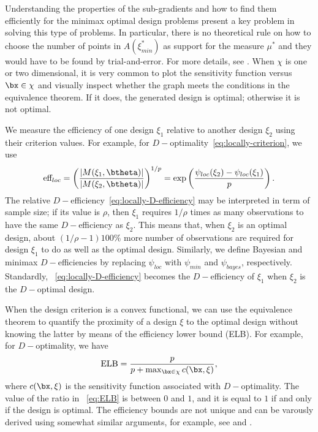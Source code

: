 Understanding the properties of the sub-gradients and how to find them efficiently for the minimax  optimal design problems present a key problem in solving this type of problems.    In particular,  there is no theoretical rule on how to choose the number of points in $A(\xi_{min}^*)$  as support for the measure $\mu^*$ and they would have to be found by trial-and-error. For more details, see \citet{masoudi2017}.
When $\chi$ is one or two dimensional, it is very common to plot the sensitivity function versus $\bx \in \chi$ and  visually inspect whether the graph meets the conditions in the equivalence theorem.  If it does, the generated design is optimal; otherwise it is not optimal.

We measure the efficiency  of one design $\xi_1$ relative to another design $\xi_2$ using their criterion values.
For example, for $D-$optimality~\eqref{eq:locally-criterion}, we use
\begin{equation}
\label{eq:locally-D-efficiency}
\mbox{eff}_{loc} =\left(\frac{|M(\xi_1, \btheta)|}{|M(\xi_2, \btheta)|}\right)^{1/p} =\exp\left(\frac{\psi_{loc}(\xi_2) - \psi_{loc}(\xi_1) }{p}\right).
\end{equation}
The relative $D-$efficiency~\eqref{eq:locally-D-efficiency} may be interpreted in term of sample size; if its value  is $\rho$, then $\xi_1$ requires $1/\rho$ times as many observations to have the same $D-$efficiency as $\xi_2$.
This means that, when $\xi_2$ is an optimal design,  about $(1/\rho-1)100\%$ more number of observations are required for design $\xi_1$ to do as well as the optimal design. Similarly, we define Bayesian and minimax $D-$efficiencies by replacing $\psi_{loc}$ with $\psi_{min}$ and $\psi_{bayes}$, respectively. Standardly, ~\eqref{eq:locally-D-efficiency} becomes the $D-$efficiency of $\xi_1$ when $\xi_2$ is the $D-$optimal design.

When the design criterion is a convex functional, we can use the equivalence theorem to  quantify the proximity of a design $\xi$ to the optimal design without knowing the latter by means of the efficiency lower bound (ELB). For example, for $D-$optimality, we have
\begin{equation}
\label{eq:ELB}
\mbox{ELB} = \frac{p}{p + \max_{\bx \in \chi}c(\bx, \xi)},
\end{equation}
where $c(\bx, \xi)$ is the sensitivity function associated with $D-$optimality. The value of the ratio in ~\eqref{eq:ELB} is between $0$ and $1$, and it is equal to $1$  if and only if the design is optimal. The efficiency bounds are not unique and can be varously derived using somewhat similar arguments, for example, see  \citet{atwood1969optimal} and \citet{pazman1986foundations}.



